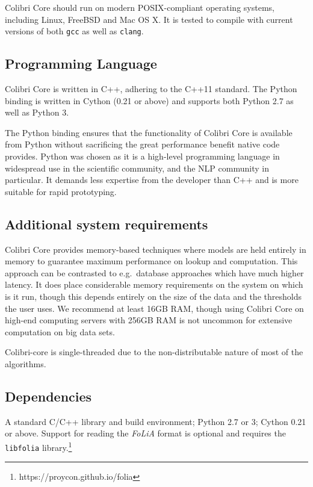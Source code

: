 \documentclass[a4paper,12pt]{article}
\begin{document}
Colibri Core should run on modern POSIX-compliant operating systems, including
Linux, FreeBSD and Mac OS X. It is tested to compile with current versions of
both \texttt{gcc} as well as \texttt{clang}.

\subsection{Programming Language}

Colibri Core is written in C++, adhering to the C++11 standard. The Python
binding is written in Cython (0.21 or above) and supports both Python 2.7 as
well as Python 3.

The Python binding ensures that the functionality of Colibri Core is available
from Python without sacrificing the great performance benefit native code
provides. Python was chosen as it is a high-level programming language in
widespread use in the scientific community, and the NLP community in
particular. It demands less expertise from the developer than C++ and is more
suitable for rapid prototyping.

\subsection{Additional system requirements}

Colibri Core provides memory-based techniques where models are held entirely in
memory to guarantee maximum performance on lookup and computation.  This
approach can be contrasted to e.g.\ database approaches which have much higher
latency.  It does place considerable memory requirements on the system on which
is it run, though this depends entirely on the size of the data and the
thresholds the user uses.  We recommend at least 16GB RAM, though using Colibri
Core on high-end computing servers with 256GB RAM is not uncommon for extensive
computation on big data sets.

Colibri-core is single-threaded due to the non-distributable nature of most of the
algorithms.

\subsection{Dependencies}

A standard C/C++ library and build environment; Python 2.7 or 3; Cython 0.21 or
above. Support for reading the \emph{FoLiA} format is optional and requires the
\texttt{libfolia} library.\footnote{https://proycon.github.io/folia}
\end{document}
